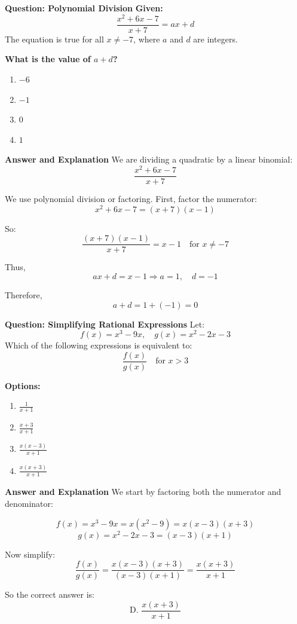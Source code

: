 \documentclass{beamer}
\begin{document}
\begin{frame}{\textbf{Question: Polynomial Division}}
\textbf{Given:}
\[
\frac{x^2 + 6x - 7}{x + 7} = ax + d
\]
The equation is true for all \( x \ne -7 \), where \( a \) and \( d \) are integers.

\textbf{What is the value of \( a + d \)?}

\begin{enumerate}
    \item[A.] $-6$
    \item[B.] $-1$
    \item[C.] $0$
    \item[D.] $1$
\end{enumerate}
\end{frame}

\begin{frame}{\textbf{Answer and Explanation}}
We are dividing a quadratic by a linear binomial:
\[
\frac{x^2 + 6x - 7}{x + 7}
\]

We use polynomial division or factoring. First, factor the numerator:
\[
x^2 + 6x - 7 = (x + 7)(x - 1)
\]

So:
\[
\frac{(x + 7)(x - 1)}{x + 7} = x - 1 \quad \text{for } x \ne -7
\]

Thus,
\[
ax + d = x - 1 \Rightarrow a = 1, \quad d = -1
\]

Therefore,
\[
a + d = 1 + (-1) = \boxed{0}
\]
\end{frame}


\begin{frame}{\textbf{Question: Simplifying Rational Expressions}}
Let:
\[
f(x) = x^3 - 9x, \quad g(x) = x^2 - 2x - 3
\]
Which of the following expressions is equivalent to:
\[
\frac{f(x)}{g(x)} \quad \text{for } x > 3
\]

\textbf{Options:}
\begin{enumerate}
    \item[A.] $\frac{1}{x + 1}$
    \item[B.] $\frac{x + 3}{x + 1}$
    \item[C.] $\frac{x(x - 3)}{x + 1}$
    \item[D.] $\frac{x(x + 3)}{x + 1}$
\end{enumerate}
\end{frame}

\begin{frame}{\textbf{Answer and Explanation}}
We start by factoring both the numerator and denominator:

\[
f(x) = x^3 - 9x = x(x^2 - 9) = x(x - 3)(x + 3)
\]
\[
g(x) = x^2 - 2x - 3 = (x - 3)(x + 1)
\]

Now simplify:
\[
\frac{f(x)}{g(x)} = \frac{x(x - 3)(x + 3)}{(x - 3)(x + 1)} = \frac{x(x + 3)}{x + 1}
\]

So the correct answer is:
\[
\boxed{\text{D. } \frac{x(x + 3)}{x + 1}}
\]
\end{frame}
\end{document}
